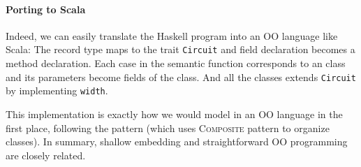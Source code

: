 \paragraph{Porting to Scala}
Indeed, we can easily translate the Haskell program into an OO
language like Scala:
The record type maps to the trait \lstinline{Circuit} and field
declaration becomes a method declaration.
Each case in the semantic function corresponds to an class and its parameters become fields of the class.
And all the classes extends \lstinline{Circuit} by implementing \lstinline{width}.


This implementation is exactly how we would model \dsl in an OO language in the first
place, following the \interp pattern (which uses \textsc{Composite} pattern to
organize classes).
In summary, shallow embedding and straightforward OO programming are closely
related.

